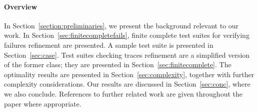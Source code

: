 \documentclass[3p,times]{elsarticle}
\begin{document}
%
%


\paragraph{Overview} In Section~\ref{section:preliminaries}, we present the
background relevant to our work. In Section~\ref{sec:finitecompletefails},
finite complete test suites for verifying failures refinement are presented.
A sample test suite is presented in Section~\ref{sec:case}. Test suites
checking traces refinement are a simplified version of the former class; they
are presented in Section~\ref{sec:finitecomplete}. The optimality results are
presented in Section~\ref{sec:complexity}, together with further complexity
considerations. Our results are discussed in Section~\ref{sec:conc}, where we
also conclude. References to further related work are given throughout the
paper where appropriate.
\end{document}
